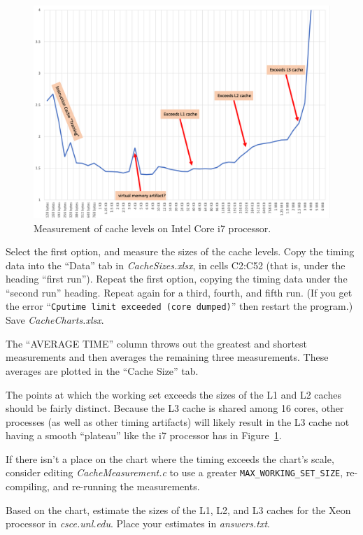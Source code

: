 \begin{figure}
    \centering
    \includegraphics[width=13cm]{IntelI7caches}
    \caption{Measurement of cache levels on Intel Core i7 processor. \label{fig:LaptopCache}}
\end{figure}

Select the first option, and measure the sizes of the cache levels. Copy the
timing data into the ``Data'' tab in \textit{CacheSizes.xlsx}, in cells C2:C52
(that is, under the heading ``first run''). Repeat the first option, copying
the timing data under the ``second run'' heading. Repeat again for a third,
fourth, and fifth run. (If you get the error ``\texttt{Cputime limit exceeded
(core dumped)}'' then restart the program.) Save \textit{CacheCharts.xlsx}.

The ``AVERAGE TIME'' column throws out the greatest and shortest measurements
and then averages the remaining three measurements. These averages are plotted
in the ``Cache Size'' tab.

The points at which the working set exceeds the sizes of the L1 and L2 caches
should be fairly distinct. Because the L3 cache is shared among 16 cores, other
processes (as well as other timing artifacts) will likely result in the L3
cache not having a smooth ``plateau'' like the i7 processor has in
Figure~\ref{fig:LaptopCache}.

If there isn't a place on the chart where the timing exceeds the chart's scale,
consider editing \textit{CacheMeasurement.c} to use a greater
\lstinline{MAX_WORKING_SET_SIZE}, re-compiling, and re-running the measurements.

Based on the chart, estimate the sizes of the L1, L2, and L3 caches for the
Xeon processor in \textit{csce.unl.edu}. Place your estimates in
\textit{answers.txt}.

